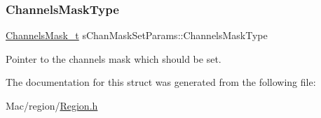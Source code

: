 \subsubsection{\texorpdfstring{Channels\+Mask\+Type}{ChannelsMaskType}}
{\footnotesize\ttfamily \hyperlink{group__REGION_ga933f695eea70935418e2175940b92311}{Channels\+Mask\+\_\+t} s\+Chan\+Mask\+Set\+Params\+::\+Channels\+Mask\+Type}

Pointer to the channels mask which should be set. 

The documentation for this struct was generated from the following file\+:\begin{DoxyCompactItemize}
\item 
Mac/region/\hyperlink{Region_8h}{Region.\+h}\end{DoxyCompactItemize}
